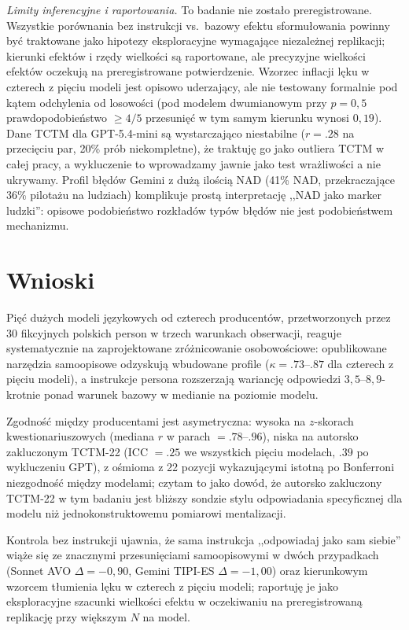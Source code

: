 \documentclass[11pt,a4paper]{article}
\begin{document}
\emph{Limity inferencyjne i raportowania.} To badanie nie zostało preregistrowane. Wszystkie porównania bez instrukcji vs.\ bazowy efektu sformułowania powinny być traktowane jako hipotezy eksploracyjne wymagające niezależnej replikacji; kierunki efektów i rzędy wielkości są raportowane, ale precyzyjne wielkości efektów oczekują na preregistrowane potwierdzenie. Wzorzec inflacji lęku w czterech z pięciu modeli jest opisowo uderzający, ale nie testowany formalnie pod kątem odchylenia od losowości (pod modelem dwumianowym przy $p = 0{,}5$ prawdopodobieństwo $\geq 4 / 5$ przesunięć w tym samym kierunku wynosi $0{,}19$). Dane TCTM dla GPT-5.4-mini są wystarczająco niestabilne ($r = .28$ na przecięciu par, 20\% prób niekompletne), że traktuję go jako outliera TCTM w całej pracy, a wykluczenie to wprowadzamy jawnie jako test wrażliwości a nie ukrywamy. Profil błędów Gemini z dużą ilością NAD (41\% NAD, przekraczające 36\% pilotażu na ludziach) komplikuje prostą interpretację ,,NAD jako marker ludzki'': opisowe podobieństwo rozkładów typów błędów nie jest podobieństwem mechanizmu.

\section{Wnioski}

Pięć dużych modeli językowych od czterech producentów, przetworzonych przez 30 fikcyjnych polskich person w trzech warunkach obserwacji, reaguje systematycznie na zaprojektowane zróżnicowanie osobowościowe: opublikowane narzędzia samoopisowe odzyskują wbudowane profile ($\kappa = .73$--$.87$ dla czterech z pięciu modeli), a instrukcje persona rozszerzają wariancję odpowiedzi $3{,}5$--$8{,}9$-krotnie ponad warunek bazowy w medianie na poziomie modelu.

Zgodność między producentami jest asymetryczna: wysoka na $z$-skorach kwestionariuszowych (mediana $r$ w parach $= .78$--$.96$), niska na autorsko zakluczonym TCTM-22 (ICC $= .25$ we wszystkich pięciu modelach, $.39$ po wykluczeniu GPT), z ośmioma z 22 pozycji wykazującymi istotną po Bonferroni niezgodność między modelami; czytam to jako dowód, że autorsko zakluczony TCTM-22 w tym badaniu jest bliższy sondzie stylu odpowiadania specyficznej dla modelu niż jednokonstruktowemu pomiarowi mentalizacji.

Kontrola bez instrukcji ujawnia, że sama instrukcja ,,odpowiadaj jako sam siebie'' wiąże się ze znacznymi przesunięciami samoopisowymi w dwóch przypadkach (Sonnet AVO $\Delta = -0{,}90$, Gemini TIPI-ES $\Delta = -1{,}00$) oraz kierunkowym wzorcem tłumienia lęku w czterech z pięciu modeli; raportuję je jako eksploracyjne szacunki wielkości efektu w oczekiwaniu na preregistrowaną replikację przy większym $N$ na model.
\end{document}
